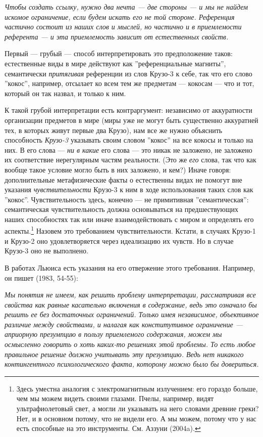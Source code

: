 \documentclass[11pt]{book}
\begin{document}
\smallskip

\textit{Чтобы создать ссылку, нужно два нечта --- две стороны --- и мы не найдем искомое ограничение, если будем искать его не той стороне. Референция частично состоит из наших слов и мыслей, но частично и в приемлемости референта --- и эта приемлемость зависит от естественных свойств.}

\smallskip

Первый --- грубый --- способ интерпретировать это предположение таков: естественные виды в мире действуют как ''референциальные магниты'', семантически \textit{притягивая} референции из слов Крузо-3 к себе, так что его слово ''кокос'', например, отсылает ко всем тем же предметам --- кокосам --- что и тот, который он так назвал, и только к ним.

К такой грубой интерпретации есть контраргумент: независимо от аккуратности организации предметов в мире (миры уже не могут быть существенно аккуратней тех, в которых живут первые два Крузо), нам все же нужно объяснить способность \textit{Крузо-3} указывать своим словом ''кокос'' на все кокосы и только на них. В его слова --- \textit{ни в какие} его слова --- это никак не заложено,  не заложено их соответствие нерегулярным частям реальности. (Это же \textit{его} слова, так что как вообще такое условие могло быть в них заложено, и кем?) Иначе говоря: дополнительные метафизические факты о естественны видах не помогут вне указания \textit{чувствительности} Крузо-3 к ним в ходе использования таких слов как ''кокос''. Чувствительность здесь, конечно --- не примитивная ''семантическая'': семантическая чувствительность должна основываться на предшествующих наших способностях так или иначе взаимодействовать с миром и определять его аспекты.\footnote{Здесь уместна аналогия с электромагнитным излучением: его гораздо больше, чем мы можем видеть своими глазами. Пчелы, например, видят ультрафиолетовый свет, а могли ли указывать на него словами древние греки? Нет, и в основном потому, что не видели его. А мы можем, потому что у нас есть способные на это инструменты. См. Аззуни (2004a).} Назовем это требованием чувствительности. Кстати, в случаях Крузо-1 и Крузо-2 оно удовлетворяется через идеализацию их чувств. Но в случае Крузо-3 оно не выполнено.

В работах Льюиса есть указания на его отвержение этого требования. Например, он пишет (1983, 54-55):

\smallskip

\textit{Мы понятия не имеем, как решить проблему интерпретации, рассматривая все свойства как равные касательно включения в содержание, ведь это означало бы решить ее без достаточных ограничений. Только имея независимое, объективное различие между свойствами, и налагая как конститутивное ограничение --- \textit{априорную} презумпцию в пользу приемлемого содержания, можем мы осмысленно говорить о хоть каких-то решениях этой проблемы. То есть любое правильное решение должно учитывать эту презумпцию. Ведь нет никакого контингентного психологического факта, которому можно было бы довериться.}
\end{document}
